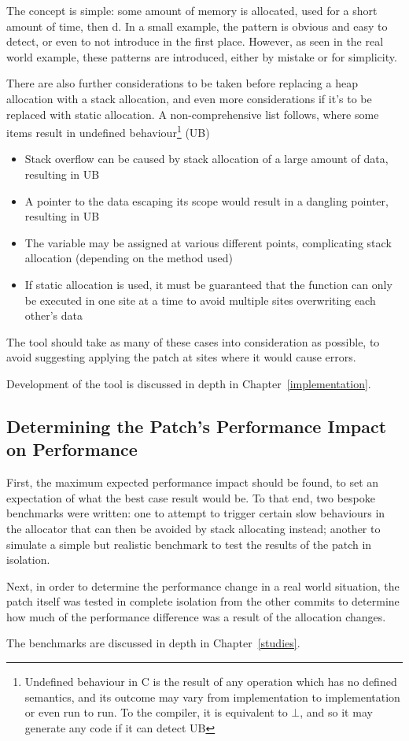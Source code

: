 The concept is simple: some amount of memory is allocated, used for a short amount of time, then \free{}d. In a small example, the pattern is obvious and easy to detect, or even to not introduce in the first place. However, as seen in the real world  example, these patterns are introduced, either by mistake or for simplicity.

There are also further considerations to be taken before replacing a heap allocation with a stack allocation, and even more considerations if it's to be replaced with static allocation. A non-comprehensive list follows, where some items result in undefined behaviour\footnote{Undefined behaviour in C is the result of any operation which has no defined semantics, and its outcome may vary from implementation to implementation or even run to run. To the compiler, it is equivalent to $\bot$, and so it may generate any code if it can detect UB} (UB)

\begin{itemize}
	\item Stack overflow can be caused by stack allocation of a large amount of data, resulting in UB
	\item A pointer to the data escaping its scope would result in a dangling pointer, resulting in UB
	\item The variable may be assigned at various different points, complicating stack allocation (depending on the method used)
	\item If static allocation is used, it must be guaranteed that the function can only be executed in one site at a time to avoid multiple sites overwriting each other's data
\end{itemize}

The tool should take as many of these cases into consideration as possible, to avoid suggesting applying the patch at sites where it would cause errors.

Development of the tool is discussed in depth in Chapter~\ref{implementation}.

\subsection{Determining the Patch's Performance Impact on Performance}

First, the maximum expected performance impact should be found, to set an expectation of what the best case result would be. To that end, two bespoke benchmarks were written: one to attempt to trigger certain slow behaviours in the allocator that can then be avoided by stack allocating instead; another to simulate a simple but realistic benchmark to test the results of the patch in isolation.

Next, in order to determine the performance change in a real world situation, the  patch itself was tested in complete isolation from the other commits to determine how much of the performance difference was a result of the allocation changes.

The benchmarks are discussed in depth in Chapter~\ref{studies}.
